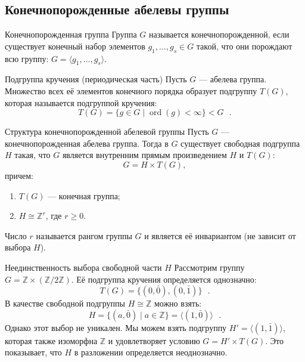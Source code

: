 \subsection{Конечнопорожденные абелевы группы}

\begin{Definition}{Конечнопорожденная группа}{}
	Группа $G$ называется конечнопорожденной, если существует конечный набор элементов $g_1, \dots, g_s \in G$ такой, что они порождают всю группу: $G = \langle g_1, \dots, g_s \rangle$.
\end{Definition}

\begin{Definition}{Подгруппа кручения (периодическая часть)}{}
	Пусть $G$ --- абелева группа. Множество всех её элементов конечного порядка образует подгруппу $T(G)$, которая называется подгруппой кручения:
	\[
	T(G) = \{ g \in G \mid \operatorname{ord}(g) < \infty \} < G \text{ }.
	\]
\end{Definition}

\begin{Theorem}{Структура конечнопорожденной абелевой группы}{}
	Пусть $G$ --- конечнопорожденная абелева группа.
	Тогда в $G$ существует свободная подгруппа $H$ такая, что $G$ является внутренним прямым произведением $H$ и $T(G)$:
	\[
	G = H \times T(G),
	\]
	причем:
	\begin{enumerate}
		\item $T(G)$ --- конечная группа;
		\item $H \cong \mathbb{Z}^r$, где $r \ge 0$.
	\end{enumerate}
	Число $r$ называется рангом группы $G$ и является её инвариантом (не зависит от выбора $H$).
\end{Theorem}

\begin{Example}{Неединственность выбора свободной части $H$}{}
	Рассмотрим группу $G = \mathbb{Z} \times (\mathbb{Z}/2\mathbb{Z})$.
	Её подгруппа кручения определяется однозначно:
	\[
	T(G) = \{ (0, \bar{0}), (0, \bar{1}) \} \text{ }.
	\]
	В качестве свободной подгруппы $H \cong \mathbb{Z}$ можно взять:
	\[
	H = \{ (a, \bar{0}) \mid a \in \mathbb{Z} \} = \langle (1, \bar{0}) \rangle \text{ }.
	\]
	Однако этот выбор не уникален. Мы можем взять подгруппу $H' = \langle (1, \bar{1}) \rangle$, которая также изоморфна $\mathbb{Z}$ и удовлетворяет условию $G = H' \times T(G)$.
	Это показывает, что $H$ в разложении определяется неоднозначно.
\end{Example}
